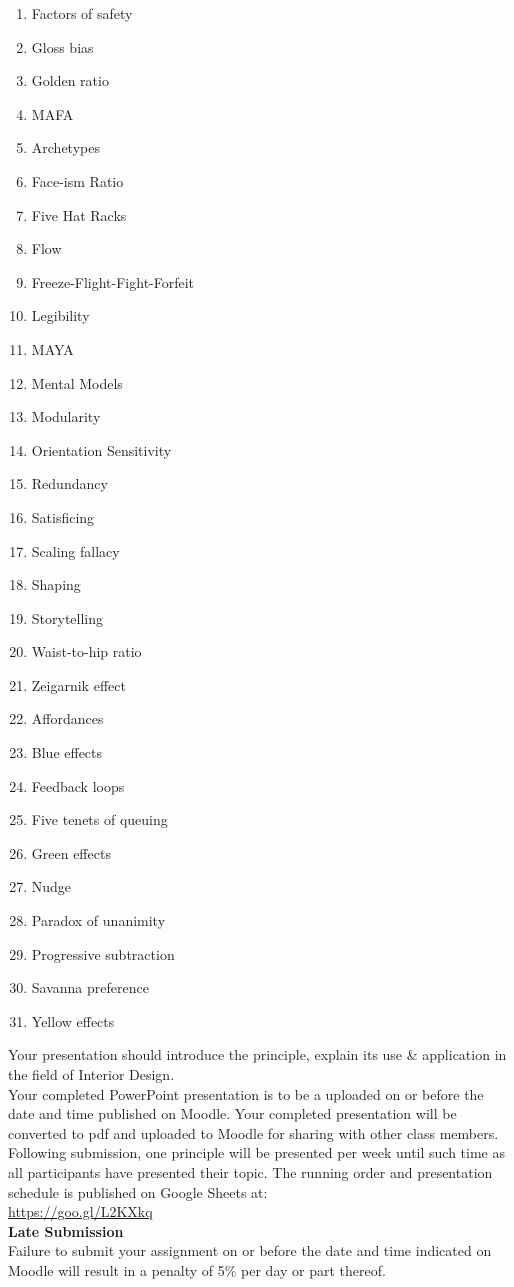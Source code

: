 \begin{enumerate}
	\item Factors of safety
	\item Gloss bias
	\item Golden ratio
	\item MAFA
	\item Archetypes
	\item Face-ism Ratio
	\item Five Hat Racks
	\item Flow
	\item Freeze-Flight-Fight-Forfeit
	\item Legibility
	\item MAYA
	\item Mental Models
	\item Modularity
	\item Orientation Sensitivity
	\item Redundancy
	\item Satisficing
	\item Scaling fallacy
	\item Shaping
	\item Storytelling
	\item Waist-to-hip ratio
	\item Zeigarnik effect
	\item Affordances
	\item Blue effects
	\item Feedback loops
	\item Five tenets of queuing
	\item Green effects
	\item Nudge
	\item Paradox of unanimity
	\item Progressive subtraction
	\item Savanna preference
	\item Yellow effects
\end{enumerate}

Your presentation should introduce the principle, explain its use \& application in the field of Interior Design.\\

Your completed PowerPoint presentation is to be a uploaded on or before the date and time published on Moodle.  Your completed presentation will be converted to pdf and uploaded to Moodle for sharing with other class members.\\

Following submission, one principle will be presented per week until such time as all participants have presented their topic.  The running order and presentation schedule is published on Google Sheets at:\\
\href{https://goo.gl/L2KXkq}{https://goo.gl/L2KXkq}\\

\textbf{Late Submission}\\
Failure to submit your assignment on or before the date and time indicated on Moodle will result in a penalty of 5\% per day or part thereof.  

